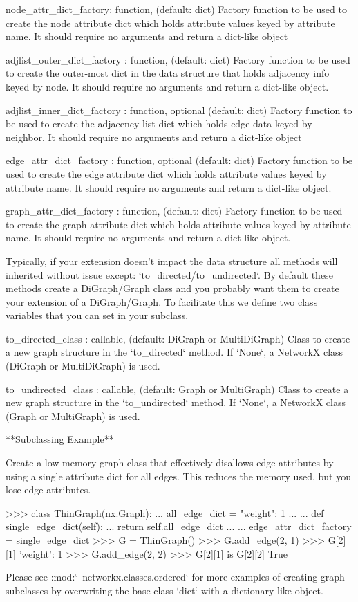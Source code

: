 \begin{DoxyVerb}
node_attr_dict_factory: function, (default: dict)
    Factory function to be used to create the node attribute
    dict which holds attribute values keyed by attribute name.
    It should require no arguments and return a dict-like object

adjlist_outer_dict_factory : function, (default: dict)
    Factory function to be used to create the outer-most dict
    in the data structure that holds adjacency info keyed by node.
    It should require no arguments and return a dict-like object.

adjlist_inner_dict_factory : function, optional (default: dict)
    Factory function to be used to create the adjacency list
    dict which holds edge data keyed by neighbor.
    It should require no arguments and return a dict-like object

edge_attr_dict_factory : function, optional (default: dict)
    Factory function to be used to create the edge attribute
    dict which holds attribute values keyed by attribute name.
    It should require no arguments and return a dict-like object.

graph_attr_dict_factory : function, (default: dict)
    Factory function to be used to create the graph attribute
    dict which holds attribute values keyed by attribute name.
    It should require no arguments and return a dict-like object.

Typically, if your extension doesn't impact the data structure all
methods will inherited without issue except: `to_directed/to_undirected`.
By default these methods create a DiGraph/Graph class and you probably
want them to create your extension of a DiGraph/Graph. To facilitate
this we define two class variables that you can set in your subclass.

to_directed_class : callable, (default: DiGraph or MultiDiGraph)
    Class to create a new graph structure in the `to_directed` method.
    If `None`, a NetworkX class (DiGraph or MultiDiGraph) is used.

to_undirected_class : callable, (default: Graph or MultiGraph)
    Class to create a new graph structure in the `to_undirected` method.
    If `None`, a NetworkX class (Graph or MultiGraph) is used.

**Subclassing Example**

Create a low memory graph class that effectively disallows edge
attributes by using a single attribute dict for all edges.
This reduces the memory used, but you lose edge attributes.

>>> class ThinGraph(nx.Graph):
...     all_edge_dict = {"weight": 1}
...
...     def single_edge_dict(self):
...         return self.all_edge_dict
...
...     edge_attr_dict_factory = single_edge_dict
>>> G = ThinGraph()
>>> G.add_edge(2, 1)
>>> G[2][1]
{'weight': 1}
>>> G.add_edge(2, 2)
>>> G[2][1] is G[2][2]
True


Please see :mod:`~networkx.classes.ordered` for more examples of
creating graph subclasses by overwriting the base class `dict` with
a dictionary-like object.
\end{DoxyVerb}
 


